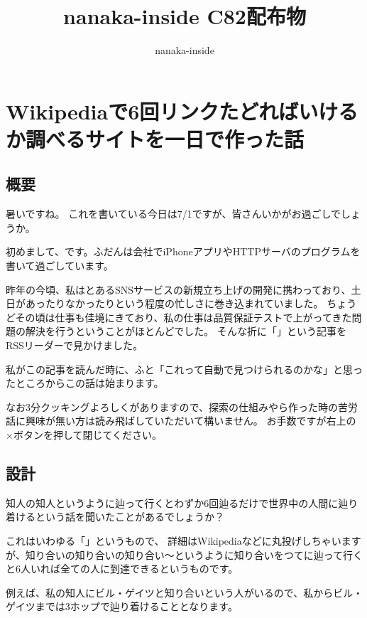 \documentclass{jsarticle}
\title{nanaka-inside C82配布物}
\author{nanaka-inside}
\begin{document}
\maketitle

\section{Wikipediaで6回リンクたどればいけるか調べるサイトを一日で作った話}
\subsection{概要}
暑いですね。
これを書いている今日は7/1ですが、皆さんいかがお過ごしでしょうか。

初めまして、です。ふだんは会社でiPhoneアプリやHTTPサーバのプログラムを書いて過ごしています。

昨年の今頃、私はとあるSNSサービスの新規立ち上げの開発に携わっており、土日があったりなかったりという程度の忙しさに巻き込まれていました。
ちょうどその頃は仕事も佳境にきており、私の仕事は品質保証テストで上がってきた問題の解決を行うということがほとんどでした。
そんな折に「」という記事をRSSリーダーで見かけました。

私がこの記事を読んだ時に、ふと「これって自動で見つけられるのかな」と思ったところからこの話は始まります。

なお3分クッキングよろしくがありますので、探索の仕組みやら作った時の苦労話に興味が無い方は読み飛ばしていただいて構いません。
お手数ですが右上の×ボタンを押して閉じてください。

\subsection{設計}
知人の知人というように辿って行くとわずか6回辿るだけで世界中の人間に辿り着けるという話を聞いたことがあるでしょうか？

これはいわゆる「」というもので、
詳細はWikipediaなどに丸投げしちゃいますが、知り合いの知り合いの知り合い〜というように知り合いをつてに辿って行くと6人いれば全ての人に到達できるというものです。

例えば、私の知人にビル・ゲイツと知り合いという人がいるので、私からビル・ゲイツまでは3ホップで辿り着けることとなります。
\end{document}
